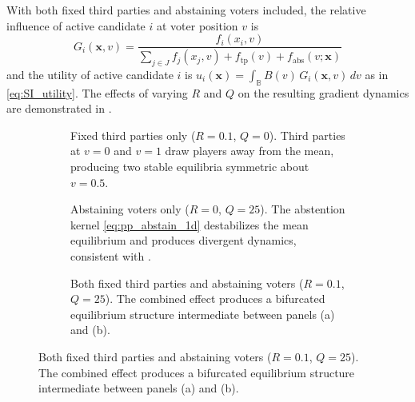 \documentclass{article}
\begin{document}
        With both fixed third parties and abstaining voters included, the relative influence of active candidate $i$ at voter position $v$ is
        \begin{equation}
            \label{eq:SI_voting_relative_influence}
            G_i(\mathbf{x}, v)
            = \frac{f_i(x_i, v)}{\sum_{j \in J} f_j(x_j, v) + f_{\mathrm{tp}}(v) + f_{\mathrm{abs}}(v;\mathbf{x})}
        \end{equation}
        and the utility of active candidate $i$ is $u_i(\mathbf{x}) = \int_\mathbb{B} B(v)\,G_i(\mathbf{x},v)\,dv$ as in \cref{eq:SI_utility}.
        The effects of varying $R$ and $Q$ on the resulting gradient dynamics are demonstrated in .

        \begin{figure}[htbp]
            \centering
            \begin{subfigure}[b]{0.3\linewidth}
                \centering
                
                \caption{Fixed third parties only ($R=0.1$, $Q=0$).
                    Third parties at $v=0$ and $v=1$ draw players away from the mean, producing two stable equilibria symmetric about $v=0.5$.}
                \label{fig:voting_dynamics:b}
                \vspace{4ex}
            \end{subfigure}
            \begin{subfigure}[b]{0.3\linewidth}
                \centering
                
                \caption{Abstaining voters only ($R=0$, $Q=25$).
                    The abstention kernel \cref{eq:pp_abstain_1d} destabilizes the mean equilibrium and produces divergent dynamics, consistent with .}
                \label{fig:voting_dynamics:c}
                \vspace{4ex}
            \end{subfigure}
            \begin{subfigure}[b]{0.3\linewidth}
                \centering
                
                \caption{Both fixed third parties and abstaining voters ($R=0.1$, $Q=25$).
                    The combined effect produces a bifurcated equilibrium structure intermediate between panels (a) and (b).}
                \label{fig:voting_dynamics:d}
                \vspace{4ex}
            \end{subfigure}


\end{figure}
\end{document}
